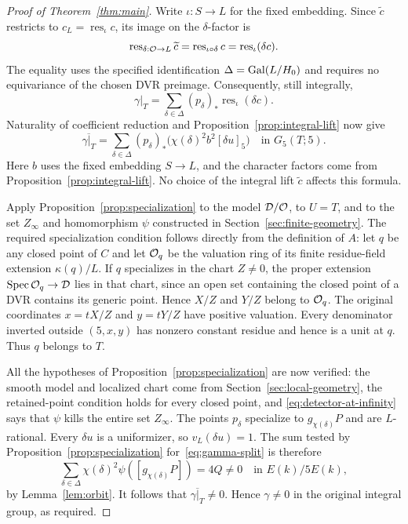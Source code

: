\begin{proof}[Proof of Theorem~\ref{thm:main}]
Write $\iota:S\to L$ for the fixed embedding. Since $\widetilde c$
restricts to $c_L=\operatorname{res}_\iota c$, its image on the
$\delta$-factor is
\[
 \operatorname{res}_{\delta:\mathcal O\to L}\widetilde c
 =\operatorname{res}_{\iota\circ\delta}c
 =\operatorname{res}_{\iota}(\delta c).
\]
The equality uses the specified identification
$\Delta=\operatorname{Gal}(L/H_0)$ and requires no equivariance of the chosen DVR
preimage. Consequently, still integrally,
\[
 \gamma|_T=\sum_{\delta\in\Delta}(p_\delta)_*
 \operatorname{res}_\iota(\delta c).
\]
Naturality of coefficient reduction and
Proposition~\ref{prop:integral-lift} now give
\begin{equation}\label{eq:gamma-split}
 \overline{\gamma|_T}
 =\sum_{\delta\in\Delta}(p_\delta)_*
       \bigl(\chi(\delta)^2b^2[\delta u]_5\bigr)
       \quad\text{in }G_5(T;5).
\end{equation}
Here $b$ uses the fixed embedding $S\to L$, and the character factors
come from Proposition~\ref{prop:integral-lift}. No choice of the integral
lift $\widetilde c$ affects this formula.

Apply Proposition~\ref{prop:specialization} to the model $\mathcal D/\mathcal O$,
to $U=T$, and to the set $Z_\infty$ and homomorphism $\psi$ constructed
in Section~\ref{sec:finite-geometry}. The required
specialization condition follows directly from the definition of $A$:
let $q$ be any closed point of $C$ and let $\mathcal O_q$ be the valuation
ring of its finite residue-field extension $\kappa(q)/L$. If $q$
specializes in the chart $Z\ne0$, the proper extension
$\operatorname{Spec}\mathcal O_q\to\mathcal D$ lies in that chart, since an open set containing
the closed point of a DVR contains its generic point. Hence $X/Z$ and
$Y/Z$ belong to $\mathcal O_q$. The original coordinates
$x=tX/Z$ and $y=tY/Z$ have positive valuation. Every denominator inverted
outside $(5,x,y)$ has nonzero constant residue and hence is a unit at $q$.
Thus $q$ belongs to $T$.

All the hypotheses of Proposition~\ref{prop:specialization} are now
verified: the smooth model and localized chart come from
Section~\ref{sec:local-geometry}, the retained-point condition holds
for every closed point, and \eqref{eq:detector-at-infinity} says that
$\psi$ kills the entire set $Z_\infty$.
The points $p_\delta$ specialize to $g_{\chi(\delta)}P$ and are
$L$-rational. Every $\delta u$ is a uniformizer, so
$v_L(\delta u)=1$. The sum tested by
Proposition~\ref{prop:specialization} for~\eqref{eq:gamma-split} is therefore
\[
 \sum_{\delta\in\Delta}\chi(\delta)^2
        \psi([g_{\chi(\delta)}P])
 =4Q\ne0\quad\text{in }E(k)/5E(k),
\]
by Lemma~\ref{lem:orbit}. It follows that
$\overline{\gamma|_T}\ne0$. Hence $\gamma\ne0$ in the original integral
group, as required.
\end{proof}

